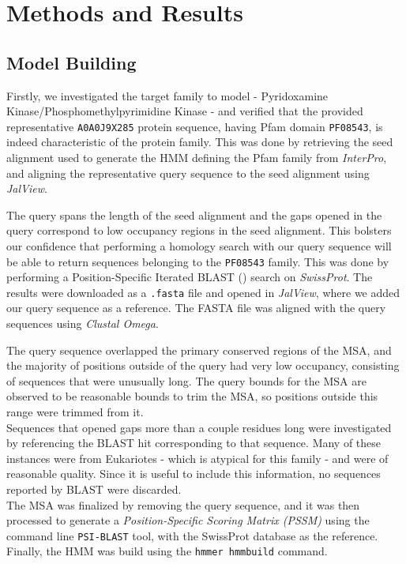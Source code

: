 \documentclass[10pt,twocolumn,letterpaper]{article}
\begin{document}
\section{Methods and Results}

\subsection{Model Building}

Firstly, we investigated the target family to model - Pyridoxamine Kinase/Phosphomethylpyrimidine Kinase - and verified that the provided representative \texttt{A0A0J9X285} protein sequence, having Pfam domain \texttt{PF08543}, is indeed characteristic of the protein family. 
This was done by retrieving the seed alignment used to generate the HMM defining the Pfam family from \textit{InterPro}, and aligning the representative query sequence to the seed alignment using \textit{JalView}.

The query spans the length of the seed alignment and the gaps opened in the query correspond to low occupancy regions in the seed alignment. This bolsters our confidence that performing a homology search with our query sequence will be able to return sequences belonging to the \texttt{PF08543} family. This was done by performing a Position-Specific Iterated BLAST () search on \textit{SwissProt}. The results were downloaded as a \texttt{.fasta} file and opened in \textit{JalView}, where we added our query sequence as a reference. The FASTA file was aligned with the query sequences using \textit{Clustal Omega}.

The query sequence overlapped the primary conserved regions of the MSA, and the majority of positions outside of the query had very low occupancy, consisting of sequences that were unusually long. The query bounds for the MSA are observed to be reasonable bounds to trim the MSA, so positions outside this range were trimmed from it. \\

Sequences that opened gaps more than a couple residues long were investigated by referencing the BLAST hit corresponding to that sequence. Many of these instances were from Eukariotes - which is atypical for this family - and were of reasonable quality. Since it is useful to include this information, no sequences reported by BLAST were discarded. \\

The MSA was finalized by removing the query sequence, and it was then processed to generate a \textit{Position-Specific Scoring Matrix (PSSM)} using the command line \texttt{PSI-BLAST} tool, with the SwissProt database as the reference. Finally, the HMM was build using the \texttt{hmmer hmmbuild} command.
\end{document}
